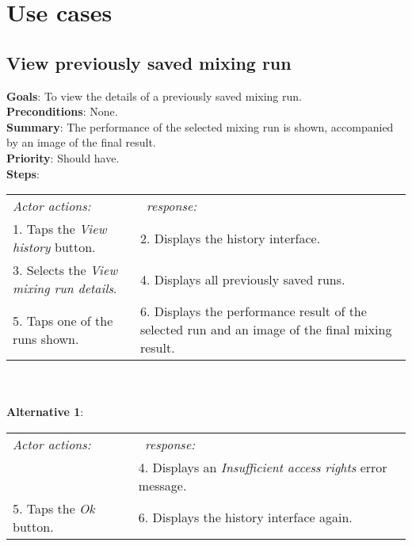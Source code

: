
\chapter{Use cases}

\section{View previously saved mixing run}
  \label{mixhist}
  \textbf{Goals}: To view the details of a previously saved mixing run.\\
  \textbf{Preconditions}: None.\\
  \textbf{Summary}: The performance of the selected mixing run is shown, accompanied by an image of the final result.\\
  \textbf{Priority}: Should have.\\
  \textbf{Steps}: \\
    \begin{tabular}{ p{} p{} }
  	\emph{Actor actions:} & \emph{\projectname\ response:} \\
    1. Taps the \emph{View history} button. & 2. Displays the history interface.\\
    3. Selects the \emph{View mixing run details}. & 4. Displays all previously saved runs.\\
    5. Taps one of the runs shown. & 6. Displays the performance result of the selected run and an image of the final mixing result. \\
    \end{tabular}
    \\
     \\\textbf{Alternative 1}: \\
    \begin{tabular}{ p{} p{} }
  	\emph{Actor actions:} & \emph{\projectname\ response:} \\
            & 4. Displays an \emph{Insufficient access rights} error message. \\
    5. Taps the \emph{Ok} button. & 6. Displays the history interface again. \\
    \end{tabular}
